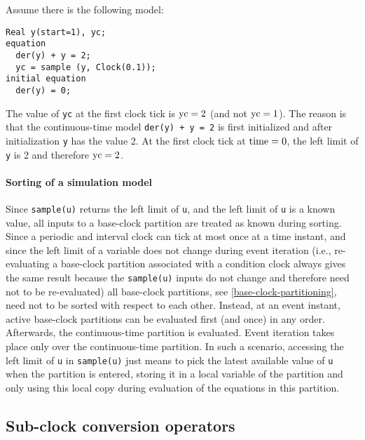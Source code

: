 \begin{example}
Assume there is the following model:
\begin{lstlisting}[language=modelica]
  Real y(start=1), yc;
equation
  der(y) + y = 2;
  yc = sample (y, Clock(0.1));
initial equation
  der(y) = 0;
\end{lstlisting}

The value of \lstinline!yc! at the first clock tick is $\text{\lstinline!yc!} = 2$ (and not $\text{\lstinline!yc!} = 1$).  The reason is that the continuous-time model \lstinline!der(y) + y = 2! is first initialized and after initialization \lstinline!y! has the value 2.  At the first clock tick at $\text{\lstinline!time!} = 0$, the left limit of \lstinline!y! is 2 and therefore $\text{\lstinline!yc!} = 2$.

\paragraph*{Sorting of a simulation model}

Since \lstinline!sample(u)! returns the left limit of \lstinline!u!, and the left limit of \lstinline!u! is a known value, all inputs to a base-clock partition are treated as known during sorting.
Since a periodic and interval clock can tick at most once at a time instant, and since the left limit of a variable does not change during event iteration (i.e., re-evaluating a base-clock partition associated with a condition clock always gives the same result because the \lstinline!sample(u)! inputs do not change and therefore need not to be re-evaluated) all base-clock partitions, see \cref{base-clock-partitioning}, need not to be sorted with respect to each other.
Instead, at an event instant, active base-clock partitions can be evaluated first (and once) in any order.
Afterwards, the continuous-time partition is evaluated.
Event iteration takes place only over the continuous-time partition.
In such a scenario, accessing the left limit of \lstinline!u! in \lstinline!sample(u)! just means to pick the latest available value of \lstinline!u! when the partition is entered, storing it in a local variable of the partition and only using this local copy during evaluation of the equations in this partition.
\end{example}

\subsection{Sub-clock conversion operators}\label{sub-clock-conversion-operators}

